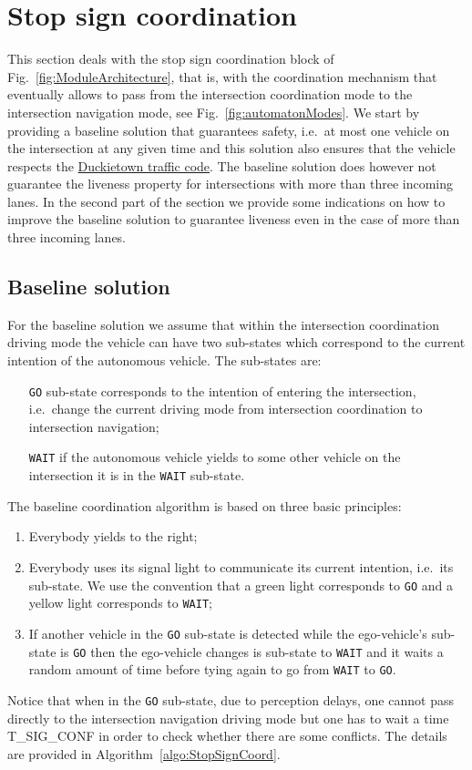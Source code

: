 \documentclass[11pt]{article}
\theoremstyle{definition}
\begin{document}
\section{Stop sign coordination}\label{sec:stopSign}
%
This section deals with the stop sign coordination block of Fig.~\ref{fig:ModuleArchitecture}, that is, with the coordination mechanism that eventually allows to pass from the intersection coordination mode to the intersection navigation mode, see Fig.~\ref{fig:automatonModes}. We start by providing a baseline solution that guarantees safety, i.e.\ at most one vehicle on the intersection at any given time and this solution also ensures that the vehicle respects the \href{https://docs.google.com/document/d/1D2l8ltY2OGA2Mxw9xxaWS9c03nI4h9DkfiE0oqJpllM/edit}{Duckietown traffic code}. The baseline solution does however not guarantee the liveness property for intersections with more than three incoming lanes. In the second part of the section we provide some indications on how to improve the baseline solution to guarantee liveness even in the case of more than three incoming lanes. 

\subsection{Baseline solution}
%
For the baseline solution we assume that within the intersection coordination driving mode the vehicle can have two sub-states which correspond to the current intention of the autonomous vehicle. The sub-states are:
\begin{enumerate}
\item[\texttt{GO}] sub-state corresponds to the intention of entering the intersection, i.e.\ change the current driving mode from intersection coordination to intersection navigation;
\item[\texttt{WAIT}] if the autonomous vehicle yields to some other vehicle on the intersection it is in the \texttt{WAIT} sub-state.
\end{enumerate}
% 
The baseline coordination algorithm is based on three basic principles:
%
\begin{enumerate}
\item Everybody yields to the right;
\item Everybody uses its signal light to communicate its current intention, i.e.\ its sub-state. We use the convention that a green light corresponds to \texttt{GO} and a yellow light corresponds to \texttt{WAIT};
\item If another vehicle in the \texttt{GO} sub-state is detected while the ego-vehicle's sub-state is \texttt{GO} then the ego-vehicle changes is sub-state to \texttt{WAIT} and it waits a random amount of time before tying again to go from \texttt{WAIT} to \texttt{GO}.
\end{enumerate} 
%
Notice that when in the \texttt{GO} sub-state, due to perception delays, one cannot pass directly to the intersection navigation driving mode but one has to wait a time T\_SIG\_CONF in order to check whether there are some conflicts. The details are provided in Algorithm~\ref{algo:StopSignCoord}.
\end{document}
